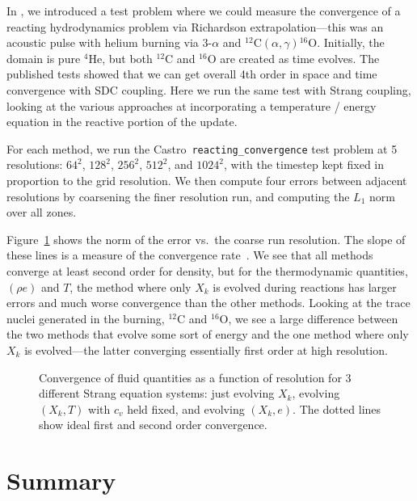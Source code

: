 \documentclass[times,preprint]{aastex631}
\newcommand{\castro}{{\sf Castro}}
\newcommand{\isotm}[2]{{}^{#2}\mathrm{#1}}
\begin{document}
In \citet{castro_sdc}, we introduced a test problem where we could
measure the convergence of a reacting hydrodynamics problem via
Richardson extrapolation---this was an acoustic pulse with helium
burning via $3$-$\alpha$ and
$\isotm{C}{12}(\alpha,\gamma)\isotm{O}{16}$.  Initially, the domain is
pure $\isotm{He}{4}$, but both $\isotm{C}{12}$ and $\isotm{O}{16}$ are
created as time evolves.  The published tests 
showed that we can get overall 4th order in space and time
convergence with SDC coupling.  Here we run the same test with Strang coupling, looking
at the various approaches at incorporating a temperature / energy equation in
the reactive portion of the update.

For each method, we run the \castro\ {\tt reacting\_convergence} test
problem at 5 resolutions: $64^2$, $128^2$, $256^2$, $512^2$, and
$1024^2$, with the timestep kept fixed in proportion to the grid resolution.
We then compute four errors between adjacent resolutions by
coarsening the finer resolution run, and computing the $L_1$ norm over
all zones.  

Figure~\ref{thefigure} shows the norm of the error vs.\ the coarse run
resolution.  The slope of these lines is a measure of the convergence
rate~\citep{ORVV}.  We see that all methods converge at least second order
for density, but for the thermodynamic quantities, $(\rho e)$ and $T$,
the method where only $X_k$ is evolved during reactions has larger
errors and much worse convergence than the other methods.  Looking at
the trace nuclei generated in the burning, $\isotm{C}{12}$ and
$\isotm{O}{16}$, we see a large difference between the two methods
that evolve some sort of energy and the one method where only $X_k$ is
evolved---the latter converging essentially first order at high
resolution.

\begin{figure}[t]
\centering
{}
\caption{\label{thefigure} Convergence of fluid quantities as a function of resolution
for 3 different Strang equation systems: just evolving $X_k$, evolving $(X_k, T)$ with $c_v$ held fixed, and evolving $(X_k, e)$. The dotted lines show ideal first and second order convergence.}
\end{figure}




\section{Summary}
\end{document}
